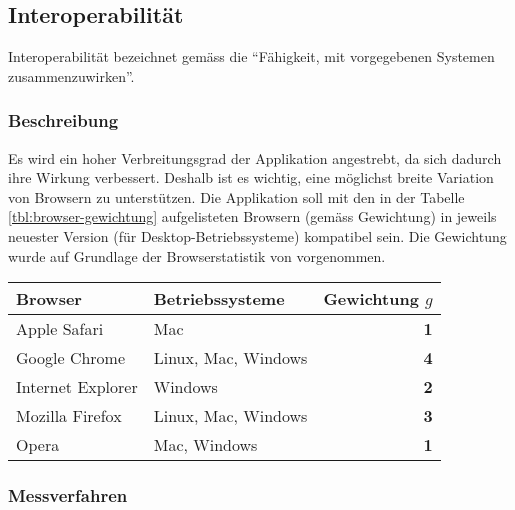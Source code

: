 \subsection{Interoperabilität}
\label{subsec:nichtfunktionale-interoperabilitaet}

Interoperabilität bezeichnet gemäss \cite{iso:9126} die \enquote{Fähigkeit, mit
vorgegebenen Systemen zusammenzuwirken}.

\subsubsection{Beschreibung}

Es wird ein hoher Verbreitungsgrad der Applikation angestrebt, da sich dadurch
ihre Wirkung verbessert. Deshalb ist es wichtig, eine möglichst breite Variation
von Browsern zu unterstützen. Die Applikation soll mit den in der Tabelle
\ref{tbl:browser-gewichtung} aufgelisteten Browsern (gemäss Gewichtung) in
jeweils neuester Version (für Desktop-Betriebssysteme) kompatibel sein. Die
Gewichtung wurde auf Grundlage der Browserstatistik von
\cite{w3schools:browserstats} vorgenommen.
\\[\intextsep]
\begin{minipage}{\linewidth}
	\centering
	\begin{tabular}{llr}
		\hline
		Browser           & Betriebssysteme     & Gewichtung $g$ \\
		\hline
		Apple Safari      & Mac                 & \textbf{1} \\
		Google Chrome     & Linux, Mac, Windows & \textbf{4} \\
		Internet Explorer & Windows             & \textbf{2} \\
		Mozilla Firefox   & Linux, Mac, Windows & \textbf{3} \\
		Opera             & Mac, Windows        & \textbf{1} \\
		\hline
	\end{tabular}
	\label{tbl:browser-gewichtung}
\end{minipage}

\subsubsection{Messverfahren}

